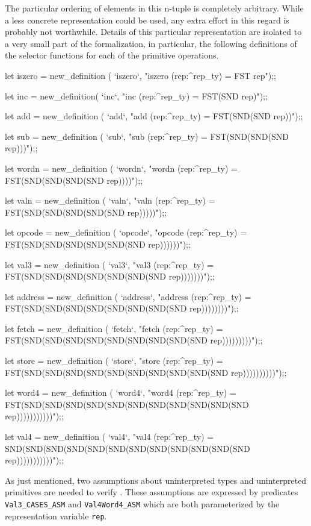 The particular ordering of elements in this \mbox{n-tuple} is completely
arbitrary.
While a less concrete representation could be used,
any extra effort in this regard is probably not worthwhile.
Details of this particular representation are isolated to
a very small part of
the formalization, in particular, the following definitions of the
selector functions for each of the primitive operations.

\begintt
let iszero = new_definition (
	`iszero`,
	"iszero (rep:^rep_ty) = FST rep");;

let inc = new_definition(
	`inc`,
	"inc (rep:^rep_ty) = FST(SND rep)");;

let add = new_definition (
	`add`,
	"add (rep:^rep_ty) = FST(SND(SND rep))");;

let sub = new_definition (
	`sub`,
	"sub (rep:^rep_ty) = FST(SND(SND(SND rep)))");;

let wordn = new_definition (
	`wordn`,
	"wordn (rep:^rep_ty) = FST(SND(SND(SND(SND rep))))");;

let valn = new_definition (
	`valn`,
	"valn (rep:^rep_ty) = FST(SND(SND(SND(SND(SND rep)))))");;
\endtt

\newpage %

\begintt
let opcode = new_definition (
	`opcode`,
	"opcode (rep:^rep_ty) =
	  FST(SND(SND(SND(SND(SND(SND rep))))))");;

let val3 = new_definition (
	`val3`,
	"val3 (rep:^rep_ty) =
	  FST(SND(SND(SND(SND(SND(SND(SND rep)))))))");;

let address = new_definition (
	`address`,
	"address (rep:^rep_ty) =
	  FST(SND(SND(SND(SND(SND(SND(SND(SND rep))))))))");;

let fetch = new_definition (
	`fetch`,
	"fetch (rep:^rep_ty) =
	  FST(SND(SND(SND(SND(SND(SND(SND(SND(SND rep)))))))))");;

let store = new_definition (
	`store`,
	"store (rep:^rep_ty) =
	  FST(SND(SND(SND(SND(SND(SND(SND(SND(SND(SND rep))))))))))");;

let word4 = new_definition (
	`word4`,
	"word4 (rep:^rep_ty) =
	  FST(SND(SND(SND(SND(SND(SND(SND(SND(SND(SND(SND rep)))))))))))");;

let val4 = new_definition (
	`val4`,
	"val4 (rep:^rep_ty) =
	  SND(SND(SND(SND(SND(SND(SND(SND(SND(SND(SND(SND rep)))))))))))");;
\endtt

\newpage %

As just mentioned,
two assumptions about uninterpreted types and
uninterpreted primitives are needed to verify \Tamarack.
These assumptions are expressed by predicates
\verb"Val3_CASES_ASM" and \verb"Val4Word4_ASM" which are both
parameterized by the representation variable \verb"rep".

